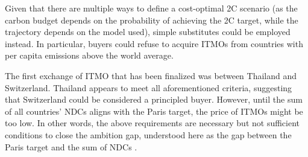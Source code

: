 \documentclass[12pt,english]{article}
\begin{document}
Given that there are multiple ways to define a cost-optimal 2\textdegree{}C scenario (as the carbon budget depends on the probability of achieving the 2\textdegree{}C target, while the trajectory depends on the model used), simple substitutes could be employed instead. In particular, buyers could refuse to acquire ITMOs from countries with per capita emissions %
above the world average. %

The first exchange of ITMO that has been finalized was between Thailand and Switzerland. %
Thailand appears to meet all aforementioned criteria, suggesting that Switzerland could be considered a principled buyer. However, until the sum of all countries' NDCs aligns with the Paris target, the price of ITMOs might be too low. In other words, the above requirements are necessary but not sufficient conditions to close the ambition gap, understood here as the gap between the Paris target and the sum of NDCs \citep{unep_emissions_2025}. %
\end{document}
